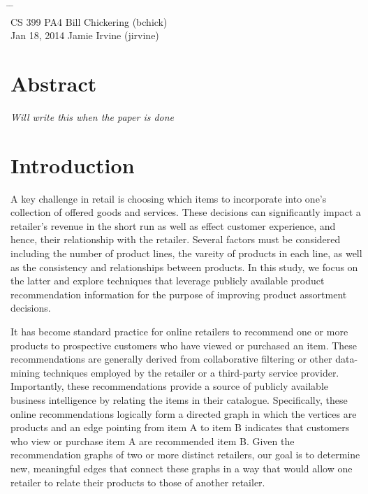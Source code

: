 \documentclass[10pt]{article}
\begin{document}

{\LARGE\bf
\begin{tabbing}
\hspace{2.8in} \= \hspace{1.3in} \= \hspace{1.2in} \= \\

CS 399 \> PA4 \> Bill Chickering (bchick)\\
\normalsize Jan 18, 2014 \> \> Jamie Irvine (jirvine)
\end{tabbing}
} \vspace{.4in}

\section*{Abstract}
\emph{Will write this when the paper is done}

\section*{Introduction}
A key challenge in retail is choosing which items to incorporate into one's
collection of offered goods and services. These decisions can significantly
impact a retailer's revenue in the short run as well as effect customer
experience, and hence, their relationship with the retailer. Several factors
must be considered including the number of product lines, the vareity of
products in each line, as well as the consistency and relationships between
products. In this study, we focus on the latter and explore techniques that
leverage publicly available product recommendation information for the purpose
of improving product assortment decisions.

It has become standard practice for online retailers to recommend one or more
products to prospective customers who have viewed or purchased an item. These
recommendations are generally derived from collaborative filtering or other
data-mining techniques employed by the retailer or a third-party service
provider. Importantly, these recommendations provide a source of publicly
available business intelligence by relating the items in their catalogue.
Specifically, these online recommendations logically form a directed graph in
which the vertices are products and an edge pointing from item A to item B
indicates that customers who view or purchase item A are recommended item B.
Given the recommendation graphs of two or more distinct retailers, our goal is
to determine new, meaningful edges that connect these graphs in a way that would
allow one retailer to relate their products to those of another retailer.
\end{document}
